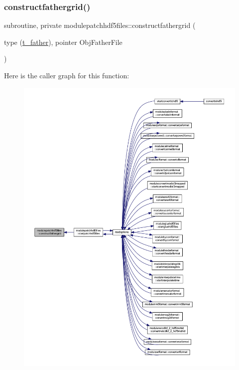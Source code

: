 \subsubsection{\texorpdfstring{constructfathergrid()}{constructfathergrid()}}
{\footnotesize\ttfamily subroutine, private modulepatchhdf5files\+::constructfathergrid (\begin{DoxyParamCaption}\item[{type (\mbox{\hyperlink{structmodulepatchhdf5files_1_1t__father}{t\+\_\+father}}), pointer}]{Obj\+Father\+File }\end{DoxyParamCaption})\hspace{0.3cm}{\ttfamily [private]}}

Here is the caller graph for this function\+:\nopagebreak
\begin{figure}[H]
\begin{center}
\leavevmode
\includegraphics[width=350pt]{namespacemodulepatchhdf5files_af7d7ef8ef3c8bc4d3657d8e7e892efe3_icgraph}
\end{center}
\end{figure}
\mbox{\label{namespacemodulepatchhdf5files_aa75e619d235deca359ee164e27280e4c}} 
